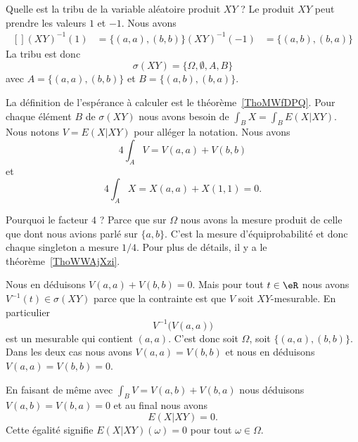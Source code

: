 \begin{subproof}

	Quelle est la tribu de la variable aléatoire produit \( XY\) ? Le produit \( XY\) peut prendre les valeurs \( 1\) et \( -1\). Nous avons
	\begin{equation}
		\begin{aligned}[]
			(XY)^{-1}(1)  & =\{ (a,a),(b,b) \}
			(XY)^{-1}(-1) & =\{ (a,b),(b,a) \}
		\end{aligned}
	\end{equation}
	La tribu est donc
	\begin{equation}
		\sigma(XY)=\{  \Omega,\emptyset, A,B  \}
	\end{equation}
	avec \( A=\{ (a,a),(b,b) \}\) et \( B=\{ (a,b),(b,a) \}\).

	\spitem[Calcul de \( E(X|XY)\)]

	La définition de l'espérance à calculer est le théorème~\ref{ThoMWfDPQ}. Pour chaque élément \( B\) de \( \sigma(XY)\) nous avons besoin de \( \int_BX=\int_B E(X|XY)\). Nous notons \( V=E(X|XY)\) pour alléger la notation. Nous avons
	\begin{equation}
		4\int_AV=V(a,a)+V(b,b)
	\end{equation}
	et
	\begin{equation}
		4\int_AX=X(a,a)+X(1,1)=0.
	\end{equation}

	Pourquoi le facteur \( 4\) ? Parce que sur \( \Omega\) nous avons la mesure produit de celle que dont nous avions parlé sur \( \{ a,b \}\). C'est la mesure d'équiprobabilité et donc chaque singleton a mesure \( 1/4\). Pour plus de détails, il y a le théorème~\ref{ThoWWAjXzi}.

	Nous en déduisons \( V(a,a)+V(b,b)=0\). Mais pour tout \( t\in \eR\) nous avons \( V^{-1}(t)\in \sigma(XY)\) parce que la contrainte est que \( V\) soit \( XY\)-mesurable. En particulier
	\begin{equation}
		V^{-1}\big( V(a,a) \big)
	\end{equation}
	est un mesurable qui contient \( (a,a)\). C'est donc soit \( \Omega\), soit \( \{ (a,a),(b,b) \}\). Dans les deux cas nous avons \( V(a,a)=V(b,b)\) et nous en déduisons \( V(a,a)=V(b,b)=0\).

	En faisant de même avec \( \int_BV=V(a,b)+V(b,a)\) nous déduisons \( V(a,b)=V(b,a)=0\) et au final nous avons
	\begin{equation}
		E(X|XY)=0.
	\end{equation}
	Cette égalité signifie \( E(X|XY)(\omega)=0\) pour tout \( \omega\in \Omega\).


\end{subproof}

